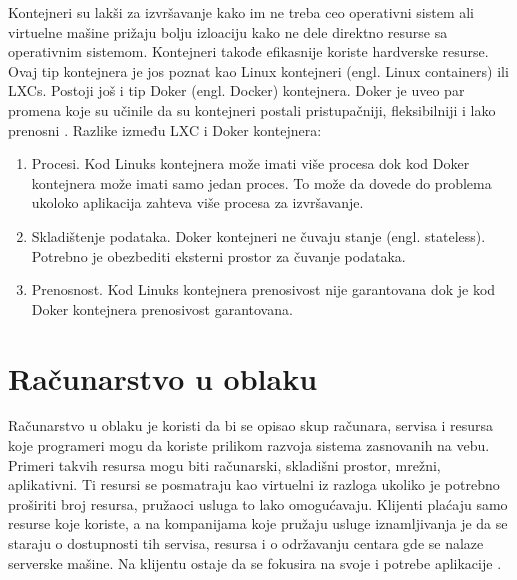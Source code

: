 \documentclass[12pt,oneside]{memoir}
\begin{document}
Kontejneri su lakši za izvršavanje kako im ne treba ceo operativni sistem ali virtuelne mašine prižaju bolju izloaciju kako ne dele direktno resurse sa operativnim sistemom. Kontejneri takođe efikasnije koriste hardverske resurse. Ovaj tip kontejnera je jos poznat kao Linux kontejneri (engl. Linux containers) ili LXCs. Postoji još i tip Doker (engl. Docker) kontejnera. Doker je uveo par promena koje su učinile da su kontejneri postali pristupačniji, fleksibilniji i lako prenosni \cite{gswc}. Razlike između LXC i Doker kontejnera:
\begin{enumerate}
  \item Procesi. Kod Linuks kontejnera može imati više procesa dok kod Doker kontejnera može imati samo jedan proces. To može da dovede do problema ukoloko aplikacija zahteva više procesa za izvršavanje.
  \item Skladištenje podataka. Doker kontejneri ne čuvaju stanje (engl. stateless). Potrebno je obezbediti eksterni prostor za čuvanje podataka.
  \item Prenosnost. Kod Linuks kontejnera prenosivost nije garantovana dok je kod Doker kontejnera prenosivost garantovana.
\end{enumerate}

\section{Računarstvo u oblaku}

Računarstvo u oblaku je koristi da bi se opisao skup računara, servisa i resursa koje programeri mogu da koriste prilikom razvoja sistema zasnovanih na vebu. Primeri takvih resursa mogu biti računarski, skladišni prostor, mrežni, aplikativni. Ti resursi se posmatraju kao virtuelni iz razloga ukoliko je potrebno proširiti broj resursa, pružaoci usluga to lako omogućavaju. Klijenti plaćaju samo resurse koje koriste, a na kompanijama koje pružaju usluge iznamljivanja je da se staraju o dostupnosti tih servisa, resursa i o održavanju centara gde se nalaze serverske mašine. Na klijentu ostaje da se fokusira na svoje i potrebe aplikacije \cite{cc}.
\end{document}
